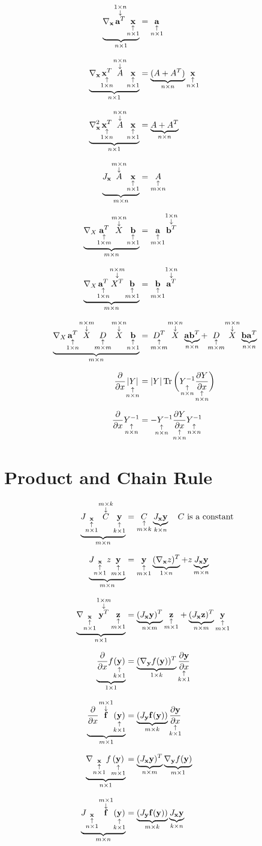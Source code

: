\documentclass[12pt]{article}
\begin{document}
\begin{align}
    \undbr{\nabla_{\bd x}\annotop{\bd a^T}{1\times n}\annot{\bd x}{n\times1}}{n\times1}
    &= \annot{\bd a}{n\times1}
    \bbr
    \undbr{\nabla_{\bd x}\annot{\bd x^T}{1\times n}\annotop{A}{n\times n}\annot{\bd x}{n\times1}}{n\times1}
    &= \undbr{(A+A^T)}{n\times n}\annot{\bd x}{n\times1}
    \bbr
    \undbr{\nabla^2_{\bd x}\annot{\bd x^T}{1\times n}\annotop{A}{n\times n}\annot{\bd x}{n\times1}}{n\times1}
    &= \undbr{A+A^T}{n\times n}
    \bbr
    \undbr{J_{\bd x}\annotop{A}{m\times n}\annot{\bd x}{n\times1}}{m\times n}
    &= \annot{A}{m\times n}
    \bbr
    \undbr{\nabla_{X}\annot{\bd a^T}{1\times m}\annotop{X}{m\times n}\annot{\bd b}{n\times1}}{m\times n}
    &= \annot{\bd a}{m\times 1}\annotop{\bd b^T}{1\times n}
    \bbr
    \undbr{\nabla_{X}\annot{\bd a^T}{1\times n}\annotop{X^T}{n\times m}\annot{\bd b}{m\times1}}{m\times n}
    &= \annot{\bd b}{m\times 1}\annotop{\bd a^T}{1\times n}
    \bbr
    \undbr{\nabla_{X}\annot{\bd a^T}{1\times n}\annotop{X}{n\times m}\annot{D}{m\times m}\annotop{X}{m\times n}\annot{\bd b}{n\times1}}{m\times n}
    &= \annot{D^T}{m\times m}\annotop{X}{m\times n}\undbr{\bd a\bd b^T}{n\times n}
    + \annot{D}{m\times m}\annotop{X}{m\times n}\undbr{\bd b\bd a^T}{n\times n}
    \bbr
    \ppx x\annot{|Y|}{n\times n}
    &=|Y|\Tr\bigg(\annot{Y\iv}{n\times n}\annot{\pypx Yx}{n\times n}\bigg)
    \bbr
    \ppx x\annot{Y\iv}{n\times n}
    &=\annot{-Y\iv}{n\times n}\annot{\pypx Yx}{n\times n}\annot{Y\iv}{n\times n}
\end{align}

\section{Product and Chain Rule}

\begin{align}
    \undbr{J_{\annot{\bd x}{n\times1}}\annotop{C}{m\times k}\annot{\bd y}{k\times1}}{m\times n}
    &= \annot{C}{m\times k}\undbr{J_{\bd x}\bd y}{k\times n}
    \sppp C \text{ is a constant}
    \bbr
    \undbr{J_{\annot{\bd x}{n\times1}}z\annot{\bd y}{m\times1}}{m\times n}
    &= \annot{\bd y}{m\times1}\undbr{(\nabla_{\bd x}z)^T}{1\times n}
    + z\undbr{J_{\bd x}\bd y}{m\times n}
    \bbr
    \undbr{\nabla_{\annot{\bd x}{n\times1}}\annotop{\bd y^T}{1\times m}\annot{\bd z}{m\times1}}{n\times1}
    &= \undbr{(J_{\bd x}\bd y)^T}{n\times m}\annot{\bd z}{m\times1}
    + \undbr{(J_{\bd x}\bd z)^T}{n\times m}\annot{\bd y}{m\times1}
    \bbr
    \undbr{\ppx xf\annot{(\bd y)}{k\times1}}{1\times1}
    &= \undbr{(\nabla_{\bd y}f(\bd y))^T}{1\times k}\annot{\pypx{\bd y}x}{k\times1}
    \bbr
    \undbr{\ppx x\annotop{\bd f}{m\times1}\annot{(\bd y)}{k\times1}}{m\times1}
    &= \undbr{(J_{\bd y}\bd f(\bd y))}{m\times k}\annot{\pypx{\bd y}x}{k\times1}
    \bbr
    \undbr{\nabla_{\annot{\bd x}{n\times1}}f\annot{(\bd y)}{m\times1}}{n\times1}
    &= \undbr{(J_{\bd x}\bd y)^T}{n\times m}\undbr{\nabla_{\bd y}f(\bd y)}{m\times1}
    \bbr
    \undbr{J_{\annot{\bd x}{n\times1}}\annotop{\bd f}{m\times1}\annot{(\bd y)}{k\times1}}{m\times n}
    &= \undbr{(J_{\bd y}\bd f(\bd y))}{m\times k}\undbr{J_{\bd x}\bd y}{k\times n}
\end{align}
\end{document}
